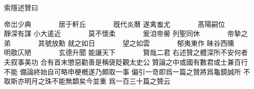 索隱述贊曰

\startnarrower[1*left]\obeylines
帝岀少典　　　　居于軒丘　　　　旣代炎曆
遂禽蚩尤　　　　髙陽嗣位　　　　靜深有謀
小大逺近　　　　莫不懷柔　　　　爰洎帝嚳
列聖同休　　　　帝摯之弟　　　　其號放勳
就之如日　　　　望之如雲　　　　郁夷東作
昧谷西曛　　　　明敭庂陋　　　　玄德升聞
能讓天下　　　　賢哉二君
\stopnarrower
\startnarrower[2*left]
右述贊之體深所不安何者夫叙事美功%
合有首末懲惡勸善是稱襃貶觀太史公%
贊論之中或國有數君或士兼百行不能%
備論終始自可略申梗槪遂乃頗取一事%
偏引一竒即爲一篇之贊將爲龜鏡誠所%
不取斯亦明月之珠不能無纇矣今並重%
爲一百三十篇之贊云%
\stopnarrower

